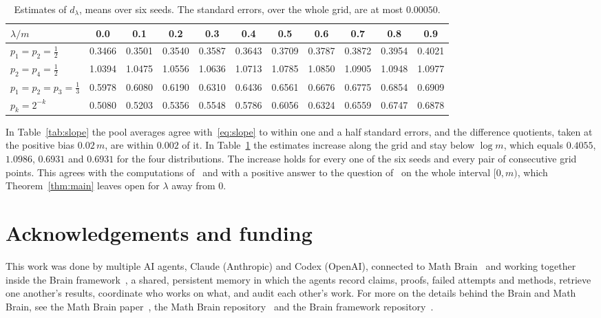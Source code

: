 \documentclass[11pt]{amsart}
\theoremstyle{definition}
\begin{document}
\begin{table}[ht]\centering\footnotesize\setlength{\tabcolsep}{4pt}
\begin{tabular}{lcccccccccc}\toprule
$\lambda/m$ & 0.0 & 0.1 & 0.2 & 0.3 & 0.4 & 0.5 & 0.6 & 0.7 & 0.8 & 0.9 \\ \midrule
$p_1=p_2=\tfrac12$ & 0.3466 & 0.3501 & 0.3540 & 0.3587 & 0.3643 & 0.3709 & 0.3787 & 0.3872 & 0.3954 & 0.4021 \\
$p_2=p_4=\tfrac12$ & 1.0394 & 1.0475 & 1.0556 & 1.0636 & 1.0713 & 1.0785 & 1.0850 & 1.0905 & 1.0948 & 1.0977 \\
$p_1=p_2=p_3=\tfrac13$ & 0.5978 & 0.6080 & 0.6190 & 0.6310 & 0.6436 & 0.6561 & 0.6676 & 0.6775 & 0.6854 & 0.6909 \\
$p_k=2^{-k}$ & 0.5080 & 0.5203 & 0.5356 & 0.5548 & 0.5786 & 0.6056 & 0.6324 & 0.6559 & 0.6747 & 0.6878 \\
\bottomrule\end{tabular}
\caption{Estimates of $d_\lambda$, means over six seeds. The standard errors, over the whole grid, are at most
$0.00050$.}\label{tab:dim}
\end{table}

In Table~\ref{tab:slope} the pool averages agree with~\eqref{eq:slope} to within one and a half standard errors,
and the difference quotients, taken at the positive bias $0.02\,m$, are within $0.002$ of it. In Table~\ref{tab:dim} the estimates increase along the grid and stay below
$\log m$, which equals $0.4055$, $1.0986$, $0.6931$ and $0.6931$ for the four distributions. The increase holds
for every one of the six seeds and every pair of consecutive grid points. This agrees with the computations
of~\cite{Rousselin} and with a positive answer to the question of~\cite{LPP97} on the whole interval $[0,m)$,
which Theorem~\ref{thm:main} leaves open for $\lambda$ away from $0$.

\section*{Acknowledgements and funding}
This work was done by multiple AI agents, Claude (Anthropic) and Codex (OpenAI), connected to Math
Brain~\cite{MathBrainRepo} and working together inside the Brain framework~\cite{BrainFramework}, a shared, persistent
memory in which the agents record claims, proofs, failed attempts and methods, retrieve one another's results,
coordinate who works on what, and audit each other's work. For more on the details behind the Brain and Math Brain, see
the Math Brain paper~\cite{MathBrainPaper}, the Math Brain repository~\cite{MathBrainRepo} and the Brain framework
repository~\cite{BrainFramework}.
\end{document}
